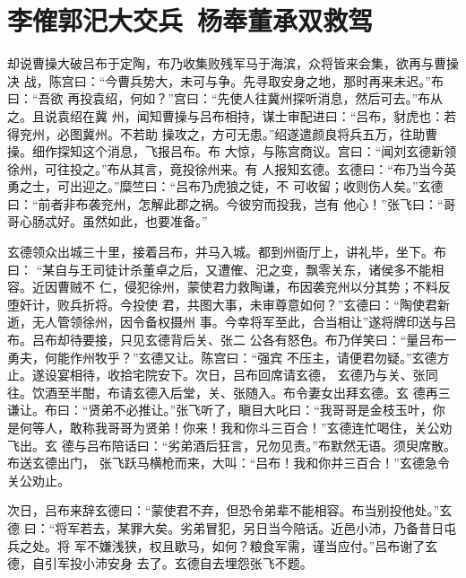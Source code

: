\chapter{李傕郭汜大交兵~杨奉董承双救驾}

却说曹操大破吕布于定陶，布乃收集败残军马于海滨，众将皆来会集，欲再与曹操决
战，陈宫曰：“今曹兵势大，未可与争。先寻取安身之地，那时再来未迟。”布曰：“吾欲
再投袁绍，何如？”宫曰：“先使人往冀州探听消息，然后可去。”布从之。且说袁绍在冀
州，闻知曹操与吕布相持，谋士审配进曰：“吕布，豺虎也：若得兖州，必图冀州。不若助
操攻之，方可无患。”绍遂遣颜良将兵五万，往助曹操。细作探知这个消息，飞报吕布。布
大惊，与陈宫商议。宫曰：“闻刘玄德新领徐州，可往投之。”布从其言，竟投徐州来。有
人报知玄德。玄德曰：“布乃当今英勇之士，可出迎之。”糜竺曰：“吕布乃虎狼之徒，不
可收留；收则伤人矣。”玄德曰：“前者非布袭兖州，怎解此郡之祸。今彼穷而投我，岂有
他心！”张飞曰：“哥哥心肠忒好。虽然如此，也要准备。”

玄德领众出城三十里，接着吕布，并马入城。都到州衙厅上，讲礼毕，坐下。布曰：
“某自与王司徒计杀董卓之后，又遭傕、汜之变，飘零关东，诸侯多不能相容。近因曹贼不
仁，侵犯徐州，蒙使君力救陶谦，布因袭兖州以分其势；不料反堕奸计，败兵折将。今投使
君，共图大事，未审尊意如何？”玄德曰：“陶使君新逝，无人管领徐州，因令备权摄州
事。今幸将军至此，合当相让”遂将牌印送与吕布。吕布却待要接，只见玄德背后关、张二
公各有怒色。布乃佯笑曰：“量吕布一勇夫，何能作州牧乎？”玄德又让。陈宫曰：“强宾
不压主，请便君勿疑。”玄德方止。遂设宴相待，收拾宅院安下。次日，吕布回席请玄德，
玄德乃与关、张同往。饮酒至半酣，布请玄德入后堂，关、张随入。布令妻女出拜玄德。玄
德再三谦让。布曰：“贤弟不必推让。”张飞听了，瞋目大叱曰：“我哥哥是金枝玉叶，你
是何等人，敢称我哥哥为贤弟！你来！我和你斗三百合！”玄德连忙喝住，关公劝飞出。玄
德与吕布陪话曰：“劣弟酒后狂言，兄勿见责。”布默然无语。须臾席散。布送玄德出门，
张飞跃马横枪而来，大叫：“吕布！我和你并三百合！”玄德急令关公劝止。

次日，吕布来辞玄德曰：“蒙使君不弃，但恐令弟辈不能相容。布当别投他处。”玄德
曰：“将军若去，某罪大矣。劣弟冒犯，另日当今陪话。近邑小沛，乃备昔日屯兵之处。将
军不嫌浅狭，权且歇马，如何？粮食军需，谨当应付。”吕布谢了玄德，自引军投小沛安身
去了。玄德自去埋怨张飞不题。

